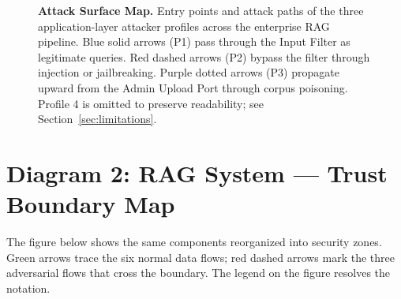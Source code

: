 \documentclass[a4paper,12pt]{report}
\begin{document}
\begin{landscape}
\begin{figure}[p]
\begin{tikzpicture}
\end{tikzpicture}
\hspace{4cm}
\caption{\textbf{Attack Surface Map.} Entry points and attack paths of the
three application-layer attacker profiles across the enterprise RAG pipeline.
Blue solid arrows (P1) pass through the Input Filter as legitimate queries.
Red dashed arrows (P2) bypass the filter through injection or jailbreaking.
Purple dotted arrows (P3) propagate upward from the Admin Upload Port through
corpus poisoning. Profile 4 is omitted to preserve readability; see
Section~\ref{sec:limitations}.}
\label{fig:attack-surface}
\end{figure}
\end{landscape}

\clearpage

\section{Diagram 2: RAG System --- Trust Boundary Map}

The figure below shows the same components reorganized into security
zones. Green arrows trace the six normal data flows; red dashed arrows
mark the three adversarial flows that cross the boundary. The legend on
the figure resolves the notation.
\end{document}

